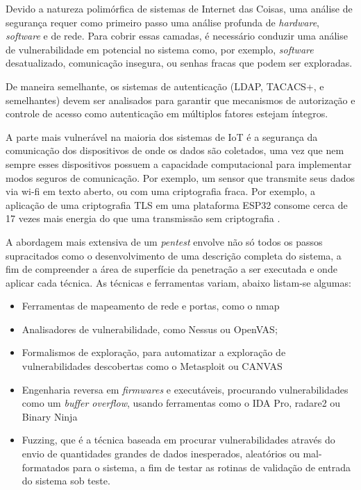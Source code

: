 \documentclass[tcc,capa]{texufpel}
\begin{document}
Devido a natureza polimórfica de sistemas de Internet das Coisas, uma análise de segurança requer como primeiro passo uma análise profunda de \textit{hardware}, \textit{software} e de rede. Para cobrir essas camadas, é necessário conduzir uma análise de vulnerabilidade em potencial no sistema como, por exemplo, \textit{software} desatualizado, comunicação insegura, ou senhas fracas que podem ser exploradas.

De maneira semelhante, os sistemas de autenticação (LDAP, TACACS+, e semelhantes) devem ser analisados para garantir que mecanismos de autorização e controle de acesso como autenticação em múltiplos fatores estejam íntegros.

A parte mais vulnerável na maioria dos sistemas de IoT é a segurança da comunicação dos dispositivos de onde os dados são coletados, uma vez que nem sempre esses dispositivos possuem a capacidade computacional para implementar modos seguros de comunicação. Por exemplo, um sensor que transmite seus dados via wi-fi em texto aberto, ou com uma criptografia fraca. Por exemplo, a aplicação de uma criptografia TLS em uma plataforma ESP32 consome cerca de 17 vezes mais energia do que uma transmissão sem criptografia \cite{fischer}.

A abordagem mais extensiva de um \textit{pentest} envolve não só todos os passos supracitados como o desenvolvimento de uma descrição completa do sistema, a fim de compreender a área de superfície da penetração a ser executada e onde aplicar cada técnica. As técnicas e ferramentas variam, abaixo listam-se algumas: 

\begin{itemize}
    \item Ferramentas de mapeamento de rede e portas, como o nmap
    \item Analisadores de vulnerabilidade, como Nessus ou OpenVAS;
    \item Formalismos de exploração, para automatizar a exploração de vulnerabilidades descobertas
    como o Metasploit ou CANVAS
    \item Engenharia reversa em \textit{firmwares} e executáveis, procurando vulnerabilidades como um \textit{buffer overflow}, usando ferramentas como o IDA Pro, radare2 ou Binary Ninja
    \item Fuzzing, que é a técnica baseada em procurar vulnerabilidades através do envio de quantidades grandes de dados inesperados, aleatórios ou mal-formatados para o sistema, a fim de testar as rotinas de validação de entrada do sistema sob teste.
\end{itemize}
\end{document}
